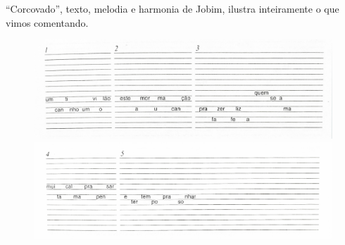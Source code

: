 ``Corcovado'', texto, melodia e harmonia de Jobim, ilustra inteiramente o
que vimos comentando.

\begin{figure}[H]
\includegraphics[width=\textwidth]{./imgs/figura1.jpg}

\includegraphics[width=\textwidth]{./imgs/figura2.jpg}
\end{figure}

